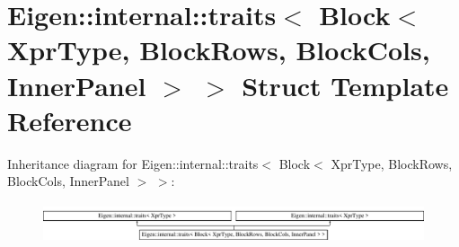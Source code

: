 \hypertarget{struct_eigen_1_1internal_1_1traits_3_01_block_3_01_xpr_type_00_01_block_rows_00_01_block_cols_00_01_inner_panel_01_4_01_4}{}\section{Eigen\+:\+:internal\+:\+:traits$<$ Block$<$ Xpr\+Type, Block\+Rows, Block\+Cols, Inner\+Panel $>$ $>$ Struct Template Reference}
\label{struct_eigen_1_1internal_1_1traits_3_01_block_3_01_xpr_type_00_01_block_rows_00_01_block_cols_00_01_inner_panel_01_4_01_4}
Inheritance diagram for Eigen\+:\+:internal\+:\+:traits$<$ Block$<$ Xpr\+Type, Block\+Rows, Block\+Cols, Inner\+Panel $>$ $>$\+:\begin{figure}[H]
\begin{center}
\leavevmode
\includegraphics[height=1.201717cm]{struct_eigen_1_1internal_1_1traits_3_01_block_3_01_xpr_type_00_01_block_rows_00_01_block_cols_00_01_inner_panel_01_4_01_4}
\end{center}
\end{figure}

